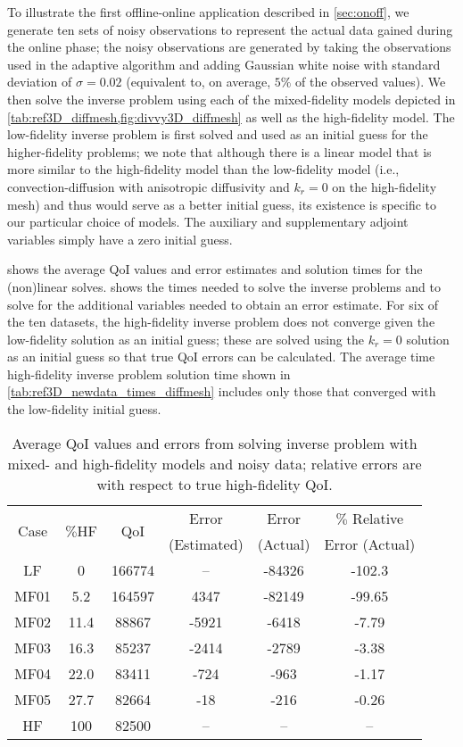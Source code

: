 To illustrate the first offline-online application described in \cref{sec:onoff}, we generate ten sets of noisy observations to represent the actual data gained during the online phase; the noisy observations are generated by taking the observations used in the adaptive algorithm and adding Gaussian white noise with standard deviation of $\sigma=0.02$ (equivalent to, on average, $5\%$ of the observed values). We then solve the inverse problem using each of the mixed-fidelity models depicted in \cref{tab:ref3D_diffmesh,fig:divvy3D_diffmesh} as well as the high-fidelity model. The low-fidelity inverse problem is first solved and used as an initial guess for the higher-fidelity problems; we note that although there is a linear model that is more similar to the high-fidelity model than the low-fidelity model (i.e., convection-diffusion with anisotropic diffusivity and $k_r=0$ on the high-fidelity mesh) and thus would serve as a better initial guess, its existence is specific to our particular choice of models. The auxiliary and supplementary adjoint variables simply have a zero initial guess. 

 shows the average QoI values and error estimates and solution times for the (non)linear solves.  shows the times needed to solve the inverse problems and to solve for the additional variables needed to obtain an error estimate. For six of the ten datasets, the high-fidelity inverse problem does not converge given the low-fidelity solution as an initial guess; these are solved using the $k_r=0$ solution as an initial guess so that true QoI errors can be calculated. The average time high-fidelity inverse problem solution time shown in \cref{tab:ref3D_newdata_times_diffmesh} includes only those that converged with the low-fidelity initial guess.  
%
\begin{table}
\caption{Average QoI values and errors from solving inverse problem with mixed- and high-fidelity models and noisy data; relative errors are with respect to true high-fidelity QoI.}
\label{tab:ref3D_newdata_QoI_diffmesh}
\centering
\begin{tabular}{|c|c|c|c|c|c|}
\hline
\multirow{2}{*}{Case} & \multirow{2}{*}{$\%$HF} & \multirow{2}{*}{QoI} & Error & Error & $\%$ Relative  \\ 
& & & (Estimated) & (Actual) & Error (Actual) \\ \hline
LF   & 0    & 166774 & --    & -84326 & -102.3 \\
MF01 & 5.2  & 164597 & 4347  & -82149 & -99.65  \\
MF02 & 11.4 & 88867  & -5921 & -6418  & -7.79  \\
MF03 & 16.3 & 85237  & -2414 & -2789  & -3.38  \\
MF04 & 22.0 & 83411  & -724  & -963   & -1.17  \\
MF05 & 27.7 & 82664  & -18   & -216   & -0.26 \\
HF   & 100 & 82500  & --    & --     & --  \\ \hline
\end{tabular}
\end{table}

